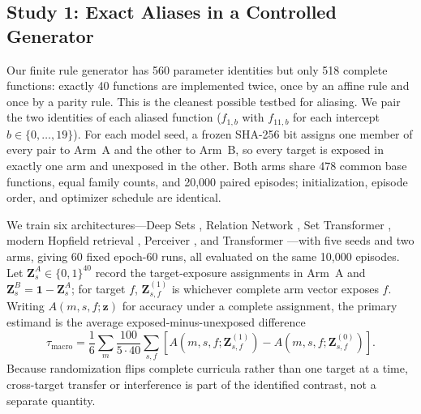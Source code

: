 \documentclass[twoside,11pt]{article}
\begin{document}
\subsection{Study 1: Exact Aliases in a Controlled Generator}
\label{sec:internal-intervention}

Our finite rule generator has 560 parameter identities but only 518
complete functions: exactly 40 functions are implemented twice, once by an
affine rule and once by a parity rule.  This is the cleanest possible
testbed for aliasing.  We pair the two identities of each aliased function
($f_{1,b}$ with $f_{11,b}$ for each intercept $b\in\{0,\ldots,19\}$).  For
each model seed, a frozen SHA-256 bit assigns one member of every pair to
Arm~A and the other to Arm~B, so every target is exposed in exactly one arm
and unexposed in the other.  Both arms share 478 common base functions,
equal family counts, and 20,000 paired episodes; initialization, episode
order, and optimizer schedule are identical.

We train six architectures---Deep Sets \citep{zaheer2017deep}, Relation
Network \citep{sung2018relation}, Set Transformer \citep{lee2019set},
modern Hopfield retrieval \citep{ramsauer2021hopfield}, Perceiver
\citep{jaegle2021perceiver}, and Transformer
\citep{vaswani2017attention}---with five seeds and two arms, giving 60 fixed
epoch-60 runs, all evaluated on the same 10,000 episodes.  Let $\mathbf
Z_s^A\in\{0,1\}^{40}$ record the target-exposure assignments in Arm~A and
$\mathbf Z_s^B=\mathbf 1-\mathbf Z_s^A$; for target $f$, $\mathbf
Z_{s,f}^{(1)}$ is whichever complete arm vector exposes $f$.  Writing
$A(m,s,f;\mathbf z)$ for accuracy under a complete assignment, the primary
estimand is the average exposed-minus-unexposed difference
\begin{equation}
\tau_{\mathrm{macro}}
=
\frac{1}{6}\sum_m
\frac{100}{5\cdot40}\sum_{s,f}
\left[
A(m,s,f;\mathbf Z_{s,f}^{(1)})
-A(m,s,f;\mathbf Z_{s,f}^{(0)})
\right].
\end{equation}
Because randomization flips complete curricula rather than one target at a
time, cross-target transfer or interference is part of the identified
contrast, not a separate quantity.
\end{document}
